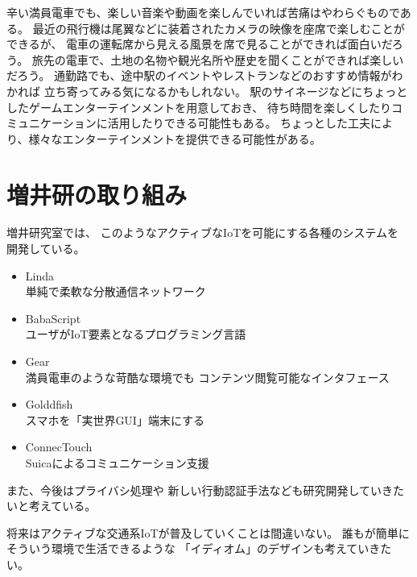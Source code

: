 \documentclass[twocolumn,10pt]{jarticle}
\begin{document}
辛い満員電車でも、楽しい音楽や動画を楽しんでいれば苦痛はやわらぐものである。
最近の飛行機は尾翼などに装着されたカメラの映像を座席で楽しむことができるが、
電車の運転席から見える風景を席で見ることができれば面白いだろう。
旅先の電車で、土地の名物や観光名所や歴史を聞くことができれば楽しいだろう。
%
通勤路でも、途中駅のイベントやレストランなどのおすすめ情報がわかれば
立ち寄ってみる気になるかもしれない。
駅のサイネージなどにちょっとしたゲームエンターテインメントを用意しておき、
待ち時間を楽しくしたりコミュニケーションに活用したりできる可能性もある。
ちょっとした工夫により、様々なエンターテインメントを提供できる可能性がある。


\section{増井研の取り組み}

増井研究室では、
このようなアクティブなIoTを可能にする各種のシステムを
開発している。

\begin{itemize}
  \setlength{\itemsep}{0cm} %
  \item Linda \\
    単純で柔軟な分散通信ネットワーク
  \item BabaScript \\
    ユーザがIoT要素となるプログラミング言語
  \item Gear \\
    満員電車のような苛酷な環境でも
    コンテンツ閲覧可能なインタフェース
  \item Golddfish \\
    スマホを「実世界GUI」端末にする
  \item ConnecTouch \\
    Suicaによるコミュニケーション支援
\end{itemize}

    

また、今後はプライバシ処理や
新しい行動認証手法なども研究開発していきたいと考えている。

将来はアクティブな交通系IoTが普及していくことは間違いない。
誰もが簡単にそういう環境で生活できるような
「イディオム」のデザインも考えていきたい。


% 
% 
% 
% 
\end{document}
